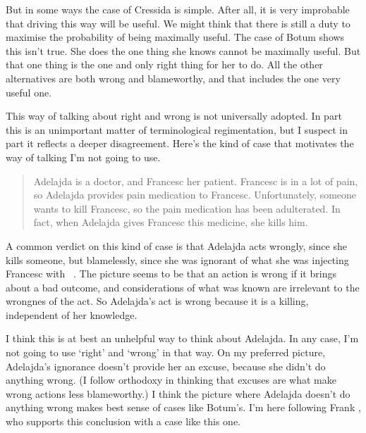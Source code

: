 But in some ways the case of \gls{Cressida} is simple. After all, it is very improbable that driving this way will be useful. We might think that there is still a duty to maximise the probability of being maximally useful. The case of \gls{Botum} shows this isn't true. She does the one thing she knows cannot be maximally useful. But that one thing is the one and only right thing for her to do. All the other alternatives are both wrong and blameworthy, and that includes the one very useful one.

This way of talking about right and wrong is not universally adopted. In part this is an unimportant matter of terminological regimentation, but I suspect in part it reflects a deeper disagreement. Here's the kind of case that motivates the way of talking I'm not going to use.

\begin{quote}
\gls{Adelajda} is a doctor, and \gls{Francesc} her patient. \gls{Francesc} is in a lot of pain, so \gls{Adelajda} provides pain medication to \gls{Francesc}. Unfortunately, someone wants to kill \gls{Francesc}, so the pain medication has been adulterated. In fact, when \gls{Adelajda} gives \gls{Francesc} this medicine, she kills him.
\end{quote}
A common verdict on this kind of case is that \gls{Adelajda} acts wrongly, since she kills someone, but blamelessly, since she was ignorant of what she was injecting \gls{Francesc} with ~\citep{Rosen2008, Graham2012, Harman2014}. The picture seems to be that an action is wrong if it brings about a bad outcome, and considerations of what was known are irrelevant to the wrongnes of the act. So \gls{Adelajda}'s act is wrong because it is a killing, independent of her knowledge.

I think this is at best an unhelpful way to think about \gls{Adelajda}. In any case, I'm not going to use `right' and `wrong' in that way. On my preferred picture, \gls{Adelajda}'s ignorance doesn't provide her an excuse, because she didn't do anything wrong. (I follow orthodoxy in thinking that excuses are what make wrong actions less blameworthy.) I think the picture where \gls{Adelajda} doesn't do anything wrong makes best sense of cases like \gls{Botum}'s. I'm here following \gls{Frank} \citet{Jackson1991}, who supports this conclusion with a case like this one.

